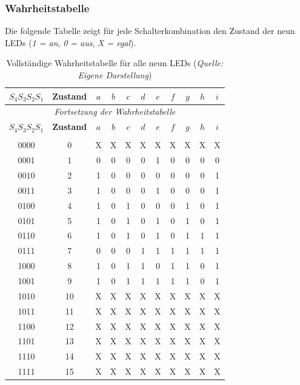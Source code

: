 \subsubsection{Wahrheitstabelle}
Die folgende Tabelle zeigt für jede Schalterkombination den Zustand der neun \acs{LED}s (\textit{1 = an}, \textit{0 = aus}, \textit{X = egal}).
\begin{longtable}{c|c|ccccccccc}
\toprule
\(S_4 S_3 S_2 S_1\) & \textbf{Zustand} & \(a\) & \(b\) & \(c\) & \(d\) & \(e\) & \(f\) & \(g\) & \(h\) & \(i\) \\
\midrule
\endfirsthead
\multicolumn{11}{c}{\textit{Fortsetzung der Wahrheitstabelle}} \\
\toprule
\(S_4 S_3 S_2 S_1\) & \textbf{Zustand} & \(a\) & \(b\) & \(c\) & \(d\) & \(e\) & \(f\) & \(g\) & \(h\) & \(i\) \\
\midrule
\endhead
\bottomrule
\endfoot
\bottomrule
\caption{Vollständige Wahrheitstabelle für alle neun \acs{LED}s (\textit{Quelle: Eigene Darstellung})} \\
\endlastfoot
0000 & 0  & X & X & X & X & X & X & X & X & X \\
0001 & 1  & 0 & 0 & 0 & 0 & 1 & 0 & 0 & 0 & 0 \\
0010 & 2  & 1 & 0 & 0 & 0 & 0 & 0 & 0 & 0 & 1 \\
0011 & 3  & 1 & 0 & 0 & 0 & 1 & 0 & 0 & 0 & 1 \\
0100 & 4  & 1 & 0 & 1 & 0 & 0 & 0 & 1 & 0 & 1 \\
0101 & 5  & 1 & 0 & 1 & 0 & 1 & 0 & 1 & 0 & 1 \\
0110 & 6  & 1 & 0 & 1 & 0 & 1 & 0 & 1 & 1 & 1 \\
0111 & 7  & 0 & 0 & 0 & 1 & 1 & 1 & 1 & 1 & 1 \\
1000 & 8  & 1 & 0 & 1 & 1 & 0 & 1 & 1 & 0 & 1 \\
1001 & 9  & 1 & 0 & 1 & 1 & 1 & 1 & 1 & 0 & 1 \\
1010 & 10 & X & X & X & X & X & X & X & X & X \\
1011 & 11 & X & X & X & X & X & X & X & X & X \\
1100 & 12 & X & X & X & X & X & X & X & X & X \\
1101 & 13 & X & X & X & X & X & X & X & X & X \\
1110 & 14 & X & X & X & X & X & X & X & X & X \\
1111 & 15 & X & X & X & X & X & X & X & X & X \\
\end{longtable}
